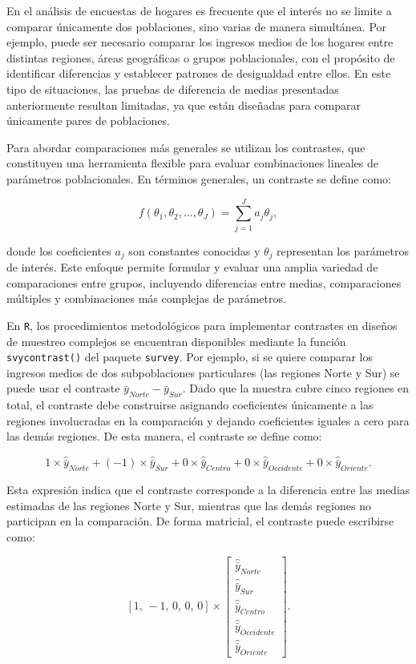 \documentclass[
  spanish,
  12pt,
]{book}
\begin{document}
En el análisis de encuestas de hogares es frecuente que el interés no se limite a comparar únicamente dos poblaciones, sino varias de manera simultánea. Por ejemplo, puede ser necesario comparar los ingresos medios de los hogares entre distintas regiones, áreas geográficas o grupos poblacionales, con el propósito de identificar diferencias y establecer patrones de desigualdad entre ellos. En este tipo de situaciones, las pruebas de diferencia de medias presentadas anteriormente resultan limitadas, ya que están diseñadas para comparar únicamente pares de poblaciones.

Para abordar comparaciones más generales se utilizan los contrastes, que constituyen una herramienta flexible para evaluar combinaciones lineales de parámetros poblacionales. En términos generales, un contraste se define como:

\[
f\left(\theta_1,\theta_2,\ldots,\theta_J\right)
=
\sum_{j=1}^{J} a_j \theta_j,
\]

donde los coeficientes \(a_j\) son constantes conocidas y \(\theta_j\) representan los parámetros de interés. Este enfoque permite formular y evaluar una amplia variedad de comparaciones entre grupos, incluyendo diferencias entre medias, comparaciones múltiples y combinaciones más complejas de parámetros.

En \texttt{R}, los procedimientos metodológicos para implementar contrastes en diseños de muestreo complejos se encuentran disponibles mediante la función \texttt{svycontrast()} del paquete \texttt{survey}. Por ejemplo, si se quiere comparar los ingresos medios de dos subpoblaciones particulares (las regiones Norte y Sur) se puede usar el contraste \(\bar{y}_{Norte} - \bar{y}_{Sur}\). Dado que la muestra cubre cinco regiones en total, el contraste debe construirse asignando coeficientes únicamente a las regiones involucradas en la comparación y dejando coeficientes iguales a cero para las demás regiones. De esta manera, el contraste se define como:

\[
1\times\hat{\bar{y}}_{Norte}+\left(-1\right)\times\hat{\bar{y}}_{Sur}+0\times\hat{\bar{y}}_{Centro}+0\times\hat{\bar{y}}_{Occidente}+0\times\hat{\bar{y}}_{Oriente}.
\]

Esta expresión indica que el contraste corresponde a la diferencia entre las medias estimadas de las regiones Norte y Sur, mientras que las demás regiones no participan en la comparación. De forma matricial, el contraste puede escribirse como:

\[
 \left[1,\,-1,\,0,\,0,\,0\right]
 \times
 \left[\begin{array}{c}
\hat{\bar{y}}_{Norte}\\
\hat{\bar{y}}_{Sur}\\
\hat{\bar{y}}_{Centro}\\
\hat{\bar{y}}_{Occidente}\\
\hat{\bar{y}}_{Oriente}
\end{array}\right].
\]
\end{document}
